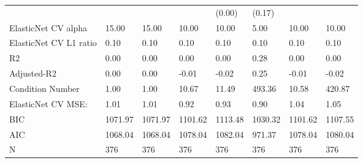 \begin{table}
\begin{center}
\begin{tabular}{llllllll}
                                               &         &         &         & (0.00)  & (0.17)   &           &          \\
ElasticNet CV alpha                            & 15.00   & 15.00   & 10.00   & 10.00   & 5.00     & 10.00     & 10.00    \\
ElasticNet CV  L1 ratio                        & 0.10    & 0.10    & 0.10    & 0.10    & 0.10     & 0.10      & 0.10     \\
R2                                             & 0.00    & 0.00    & 0.00    & 0.00    & 0.28     & 0.00      & 0.00     \\
Adjusted-R2                                    & 0.00    & 0.00    & -0.01   & -0.02   & 0.25     & -0.01     & -0.02    \\
Condition Number                               & 1.00    & 1.00    & 10.67   & 11.49   & 493.36   & 10.58     & 420.87   \\
ElasticNet CV MSE:                             & 1.01    & 1.01    & 0.92    & 0.93    & 0.90     & 1.04      & 1.05     \\
BIC                                            & 1071.97 & 1071.97 & 1101.62 & 1113.48 & 1030.32  & 1101.62   & 1107.55  \\
AIC                                            & 1068.04 & 1068.04 & 1078.04 & 1082.04 & 971.37   & 1078.04   & 1080.04  \\
N                                              & 376     & 376     & 376     & 376     & 376      & 376       & 376      \\
\hline
\end{tabular}
\end{center}
\end{table}